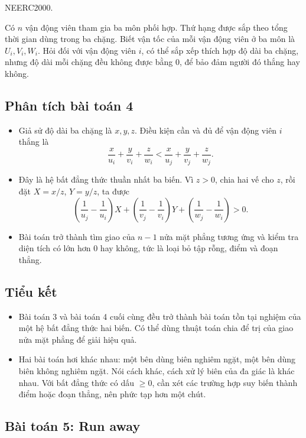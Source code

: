 \documentclass[11pt]{article}
\begin{document}
NEERC2000.

Có \(n\) vận động viên tham gia ba môn phối hợp. Thứ hạng được sắp theo tổng
thời gian dùng trong ba chặng. Biết vận tốc của mỗi vận động viên ở ba môn
là \(U_i,V_i,W_i\). Hỏi đối với vận động viên \(i\), có thể sắp xếp thích
hợp độ dài ba chặng, nhưng độ dài mỗi chặng đều không được bằng \(0\), để bảo
đảm người đó thắng hay không.

\subsection*{Phân tích bài toán 4}

\begin{itemize}
  \item Giả sử độ dài ba chặng là \(x,y,z\). Điều kiện cần và đủ để vận động
  viên \(i\) thắng là
  \[
    \frac{x}{u_i}+\frac{y}{v_i}+\frac{z}{w_i}
    <
    \frac{x}{u_j}+\frac{y}{v_j}+\frac{z}{w_j}.
  \]
  \item Đây là hệ bất đẳng thức thuần nhất ba biến. Vì \(z>0\), chia hai vế
  cho \(z\), rồi đặt \(X=x/z\), \(Y=y/z\), ta được
  \[
    \left(\frac{1}{u_j}-\frac{1}{u_i}\right)X
    +\left(\frac{1}{v_j}-\frac{1}{v_i}\right)Y
    +\left(\frac{1}{w_j}-\frac{1}{w_i}\right)>0.
  \]
  \item Bài toán trở thành tìm giao của \(n-1\) nửa mặt phẳng tương ứng và
  kiểm tra diện tích có lớn hơn \(0\) hay không, tức là loại bỏ tập rỗng,
  điểm và đoạn thẳng.
\end{itemize}

\subsection*{Tiểu kết}

\begin{itemize}
  \item Bài toán 3 và bài toán 4 cuối cùng đều trở thành bài toán tồn tại
  nghiệm của một hệ bất đẳng thức hai biến. Có thể dùng thuật toán chia để
  trị của giao nửa mặt phẳng để giải hiệu quả.
  \item Hai bài toán hơi khác nhau: một bên dùng biên nghiêm ngặt, một bên
  dùng biên không nghiêm ngặt. Nói cách khác, cách xử lý biên của đa giác là
  khác nhau. Với bất đẳng thức có dấu \(\ge 0\), cần xét các trường hợp suy
  biến thành điểm hoặc đoạn thẳng, nên phức tạp hơn một chút.
\end{itemize}

\subsection*{Bài toán 5: Run away}
\end{document}
